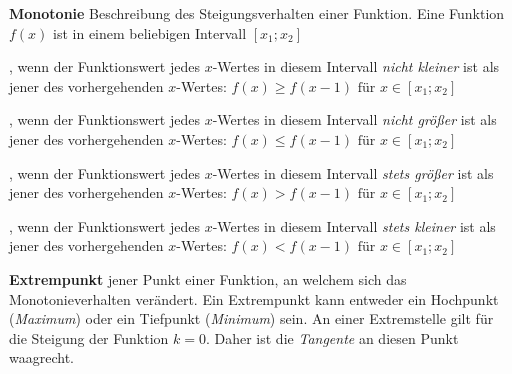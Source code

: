 \textbf{Monotonie}  Beschreibung des Steigungsverhalten einer Funktion. Eine Funktion $f(x)$ ist in einem beliebigen Intervall $[x_{1}; x_{2}]$

\begin{itemize}
	, wenn der Funktionswert jedes $x$-Wertes in diesem Intervall \emph{nicht kleiner} ist als jener des vorhergehenden $x$-Wertes: $f(x) \geq f(x-1) \text{ f\"{u}r } x \in [x_{1}; x_{2}]$

	, wenn der Funktionswert jedes $x$-Wertes in diesem Intervall \emph{nicht gr\"{o}\ss{}er} ist als jener des vorhergehenden $x$-Wertes: $f(x) \leq f(x-1) \text{ f\"{u}r } x \in [x_{1}; x_{2}]$

	, wenn der Funktionswert jedes $x$-Wertes in diesem Intervall \emph{stets gr\"{o}\ss{}er} ist als jener des vorhergehenden $x$-Wertes: $f(x) > f(x-1) \text{ f\"{u}r } x \in [x_{1}; x_{2}]$

	, wenn der Funktionswert jedes $x$-Wertes in diesem Intervall \emph{stets kleiner} ist als jener des vorhergehenden $x$-Wertes: $f(x) < f(x-1) \text{ f\"{u}r } x \in [x_{1}; x_{2}]$

\end{itemize}

\pagebreak

\begin{figure}[h!]
\centering
\end{figure}

\textbf{Extrempunkt}  jener Punkt einer Funktion, an welchem sich das Monotonieverhalten ver\"{a}ndert. Ein Extrempunkt kann entweder ein Hochpunkt (\emph{Maximum}) oder ein Tiefpunkt (\emph{Minimum}) sein. An einer Extremstelle gilt f\"{u}r die Steigung der Funktion $k = 0$. Daher ist die \emph{Tangente} an diesen Punkt waagrecht.

